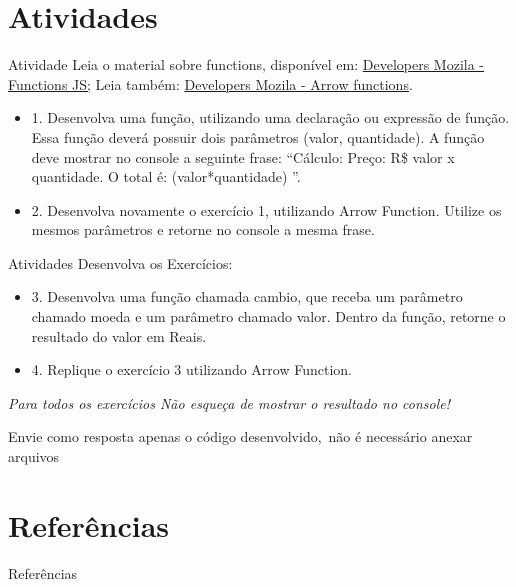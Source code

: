 \documentclass{beamer}
\begin{document}
\section{Atividades}
\begin{frame}{Atividade}
Leia o material sobre functions, disponível em: 
\href{https://developer.mozilla.org/pt-BR/docs/Web/JavaScript/Reference/Functions}{Developers Mozila - Functions JS;}
Leia também: \href{https://developer.mozilla.org/pt-BR/docs/Web/JavaScript/Reference/Functions/Arrow_functions}{Developers Mozila - Arrow functions}.
\begin{itemize}
    \item 1. Desenvolva uma função, utilizando uma declaração ou expressão de função. Essa função deverá possuir dois parâmetros (valor, quantidade). A função deve mostrar no console a seguinte frase: “Cálculo: Preço: R\$ valor x quantidade. O total é: (valor*quantidade) ”.
    \item 2. Desenvolva novamente o exercício 1, utilizando Arrow Function. Utilize os mesmos parâmetros e retorne no console a mesma frase.
\end{itemize}
\end{frame}

\begin{frame}{Atividades}
Desenvolva os Exercícios:
\begin{itemize}
    \item 3. Desenvolva uma função chamada cambio, que receba um parâmetro chamado moeda e um parâmetro chamado valor. Dentro da função, retorne o resultado do valor em Reais.
    \item 4. Replique o exercício 3 utilizando Arrow Function.
\end{itemize}

\textit{Para todos os exercícios Não esqueça de mostrar o resultado no console!}


Envie como resposta apenas o código desenvolvido, não é necessário anexar arquivos

    
\end{frame}

\section{Referências}
\begin{frame}{Referências}%
\small
\begin{center}
\tiny


\end{center}
\end{frame}
  
\end{document}
